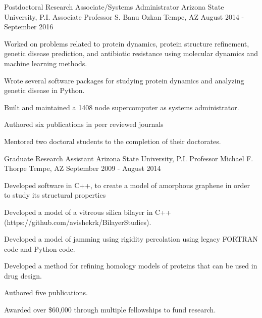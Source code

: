\begin{cventries}
  \cventry
    {Postdoctoral Research Associate/Systems Administrator} %
    {Arizona State University, P.I. Associate Professor S. Banu Ozkan} %
    {Tempe, AZ} %
    {August 2014 - September 2016} %
    {
      \begin{cvitems} %
      \setlength\itemsep{.5em}
        \item {Worked on problems related to protein dynamics, protein structure refinement, genetic disease prediction, and antibiotic resistance using molecular dynamics and machine learning methods.}
        \item {Wrote several software packages for studying protein dynamics and analyzing genetic disease in Python.}
        \item {Built and maintained a 1408 node supercomputer as systems administrator.}
        \item {Authored six publications in peer reviewed journals}
        \item {Mentored two doctoral students to the completion of their doctorates.}
      \end{cvitems}
    }

  \cventry
  {Graduate Research Assistant} %
  {Arizona State University, P.I. Professor Michael F. Thorpe} %
  {Tempe, AZ} %
  {September 2009 - August 2014} %
    {
      \begin{cvitems} %
      \setlength\itemsep{.5em}
        \item {Developed software in C++, to create a model of amorphous graphene in order to study its structural properties}
        \item {Developed a model of a vitreous silica bilayer in C++ (https://github.com/avishekrk/BilayerStudies).}
        \item {Developed a model of jamming using rigidity percolation using legacy FORTRAN code and Python code.}
        \item {Developed a method for refining homology models of proteins that can be used in drug design.}
        \item {Authored five publications.}
        \item {Awarded over \$60,000 through multiple fellowships to fund research.}
      \end{cvitems}
    }


\end{cventries}
